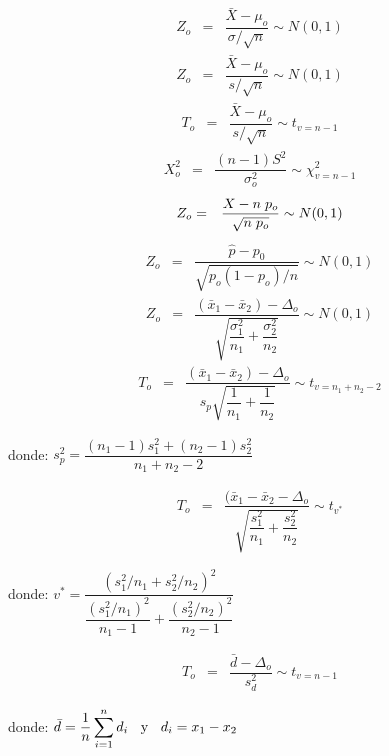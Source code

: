 \documentclass[base=hide,9pt]{elegantbook}
\begin{document}
\begin{multicols}{2}
\begin{eqnarray}
Z_{o}&=&\dfrac{\bar{X}-\mu_{o}}{\sigma/\sqrt{n}}\sim N(0,1) 
\end{eqnarray}
\begin{eqnarray}
Z_{o}&=&\dfrac{\bar{X}-\mu_{o}}{s/\sqrt{n}} \sim N(0,1)
\end{eqnarray}
\begin{eqnarray}
T_{o}&=&\dfrac{\bar{X}-\mu_{o}}{s/\sqrt{n}} \sim t_{v=n-1} 
\end{eqnarray}
\begin{eqnarray}
X^{2}_{o}&=&\dfrac{(n-1)S^{2}}{\sigma_{o}^{2}} \sim \chi^{2}_{v=n-1} 
\end{eqnarray}
\begin{eqnarray}
Z_{o}&=& \dfrac{X-n \hspace{.1cm} p_{o}}{\sqrt{n \hspace{.1cm }p_{o}}} \sim N(0,1)
\end{eqnarray}
\begin{eqnarray*}
Z_{o}&=&\dfrac{\widehat{p}-p_{0}}{\sqrt{p_{o}(1-p_{o})/n}} \sim N(0,1)
\end{eqnarray*}
\begin{eqnarray}
Z_{o}&=&\dfrac{(\bar{x}_{1}-\bar{x}_{2})- \Delta_{o}}{\sqrt{\dfrac{\sigma_{1}^{2}}{n_{1}}+\dfrac{\sigma_{2}^{2}}{n_{2}}}} \sim N(0,1)
\end{eqnarray}
\begin{eqnarray}
T_{o}&=& \dfrac{(\bar{x}_{1}-\bar{x}_{2})-\Delta_{o}}{s_{p}\sqrt{\dfrac{1}{n_{1}} + \dfrac{1}{n_{2}}}} \sim t_{v=n_{1}+n_{2}-2}
\end{eqnarray}
\begin{center}
donde: $s^{2}_{p}=\dfrac{(n_{1}-1)s_{1}^{2}+(n_{2}-1)s^{2}_{2}}{n_{1}+n_{2}-2}$
\end{center}
\begin{eqnarray}
T_{o}&=& \dfrac{(\bar{x}_{1}-\bar{x}_{2}-\Delta_{o}}{\sqrt{\dfrac{s^{2}_{1}}{n_{1}}+\dfrac{s^{2}_{2}}{n_{2}}}} \sim t_{v^{*}}
\end{eqnarray}
\begin{center}
donde: $v^{*}= \dfrac{(s^{2}_{1}/n_{1} + s^{2}_{2}/n_{2})^{2}}{\dfrac{(s^{2}_{1}/n_{1})^{2}}{n_{1}-1}+\dfrac{(s^{2}_{2}/n_{2})^{2}}{n_{2}-1}}$
\end{center}
\begin{eqnarray}
T_{o}&=& \dfrac{\bar{d}-\Delta_{o}}{s_{d}^{2}} \sim t_{v=n-1}
\end{eqnarray}
\begin{center}
donde: $\bar{d}=\dfrac{1}{n}\displaystyle\sum_{i=1}^{n}d_{i} \hspace{.2cm}\text{ y } \hspace{.2cm} d_{i} = x_{1}-x_{2}$
\end{center}
 

\end{multicols}
\end{document}
